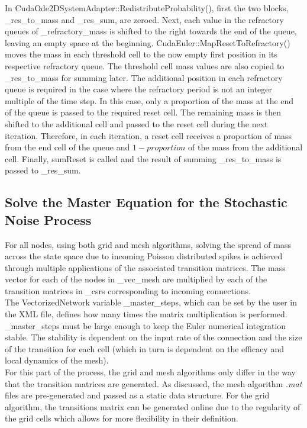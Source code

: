 \documentclass[utf8]{frontiers_suppmat} %
\begin{document}
In CudaOde2DSystemAdapter::RedistributeProbability(), first the two blocks, \_res\_to\_mass and \_res\_sum, are zeroed. Next, each value in the refractory queues of \_refractory\_mass is shifted to the right towards the end of the queue, leaving an empty space at the beginning. CudaEuler::MapResetToRefractory() moves the mass in each threshold cell to the now empty first position in its respective refractory queue. The threshold cell mass values are also copied to \_res\_to\_mass for summing later. The additional position in each refractory queue is required in the case where the refractory period is not an integer multiple of the time step. In this case, only a proportion of the mass at the end of the queue is passed to the required reset cell. The remaining mass is then shifted to the additional cell and passed to the reset cell during the next iteration. Therefore, in each iteration, a reset cell receives a proportion of mass from the end cell of the queue and $1 - proportion$ of the mass from the additional cell. Finally, sumReset is called and the result of summing \_res\_to\_mass is passed to \_res\_sum.\\

\subsection{Solve the Master Equation for the Stochastic Noise Process}

For all nodes, using both grid and mesh algorithms, solving the spread of mass across the state space due to incoming Poisson distributed spikes is achieved through multiple applications of the associated transition matrices. The mass vector for each of the nodes in \_vec\_mesh are multiplied by each of the transition matrices in \_csrs corresponding to incoming connections.\\
The VectorizedNetwork variable \_master\_steps, which can be set by the user in the XML file, defines how many times the matrix multiplication is performed. \_master\_steps must be large enough to keep the Euler numerical integration stable. The stability is dependent on the input rate of the connection and the size of the transition for each cell (which in turn is dependent on the efficacy and local dynamics of the mesh). \\
For this part of the process, the grid and mesh algorithms only differ in the way that the transition matrices are generated. As discussed, the mesh algorithm \textit{.mat} files are pre-generated and passed as a static data structure. For the grid algorithm, the transitions matrix can be generated online due to the regularity of the grid cells which allows for more flexibility in their definition.\\
\end{document}
